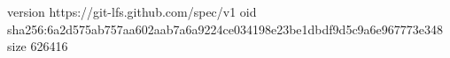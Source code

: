 version https://git-lfs.github.com/spec/v1
oid sha256:6a2d575ab757aa602aab7a6a9224ce034198e23be1dbdf9d5c9a6e967773e348
size 626416
